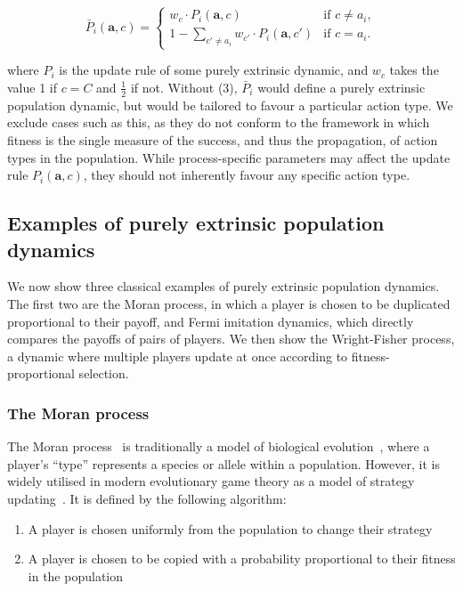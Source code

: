 \documentclass{article}
\begin{document}
\[
\bar{P}_i(\mathbf{a}, c) =
\begin{cases}
w_c \cdot P_i(\mathbf{a}, c) & \text{if } c \neq a_i, \\
1 - \sum_{c' \neq a_i} w_{c'} \cdot P_i(\mathbf{a}, c') & \text{if } c = a_i.
\end{cases}
\]

where \(P_i\) is the update rule of some purely extrinsic dynamic, and
\(w_c\) takes the value 1 if \(c = C\) and \(\frac{1}{2}\) if not. Without
(3), \(\bar{P}_i\) would define a purely extrinsic population dynamic, but would
be tailored to favour a particular action type. We exclude cases such as this,
as they do not conform to the framework in which fitness is the single measure
of the success, and thus the propagation, of action types in the population.
While process-specific parameters may affect the update rule \(P_i(\mathbf{a},
c)\), they should not inherently favour any specific action type.

\subsection{Examples of purely extrinsic population dynamics}

We now show three classical examples of purely extrinsic population dynamics.
The first two are the Moran process, in which a player is chosen to be
duplicated proportional to their payoff, and Fermi imitation dynamics, which
directly compares the payoffs of pairs of players. We then show the
Wright-Fisher process, a dynamic where multiple players update at once according
to fitness-proportional selection.

\subsubsection{The Moran process}

The Moran process~\cite{Moran_1958} is traditionally a model of biological
evolution~\cite{568a8a9c-d8ae-3d24-9fc2-3d33340230e7}, where a player's ``type''
represents a species or allele within a population. However, it is widely
utilised in modern evolutionary game theory as a model of strategy
updating~\cite{knight2018evolution, LIU2015242, OHTSUKI2007289}.
It is defined by the following algorithm:
\begin{enumerate}
    \item A player is chosen uniformly from the population to change their
        strategy
    \item A player is chosen to be copied with a probability proportional to 
    their fitness in the population
\end{enumerate}
\end{document}
